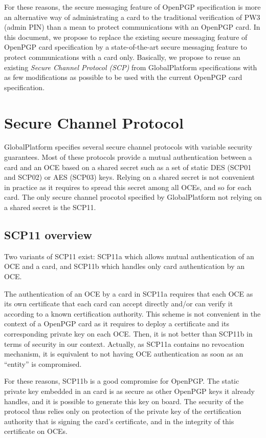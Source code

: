\documentclass[dvipdfmx,11pt,a4paper,english,final]{article}
\newcommand{\gp}[0]{Glo\-bal\-Plat\-form\xspace}
\begin{document}
For these reasons, the secure messaging feature of OpenPGP
specification is more an alternative way of administrating a card to
the traditional verification of PW3 (admin PIN) than a mean to protect
communications with an OpenPGP card. In this document, we propose to
replace the existing secure messaging feature of OpenPGP card
specification by a state-of-the-art secure messaging feature to
protect communications with a card only. Basically, we propose to
reuse an existing \emph{Secure Channel Protocol (SCP)} from \gp
specifications with as few modifications as possible to be used with
the current OpenPGP card specification.


\section{Secure Channel Protocol}
\label{sec:scp}

\gp specifies several secure channel protocols with variable security
guarantees. Most of these protocols provide a mutual authentication
between a card and an OCE based on a shared secret such as a set of
static DES (SCP01 and SCP02) or AES (SCP03) keys. Relying on a shared
secret is not convenient in practice as it requires to spread this
secret among all OCEs, and so for each card. The only secure channel
procotol specified by \gp not relying on a shared secret is the SCP11.

\subsection{SCP11 overview}

Two variants of SCP11 exist: SCP11a which allows mutual authentication
of an OCE and a card, and SCP11b which handles only card
authentication by an OCE.

The authentication of an OCE by a card in SCP11a requires that each
OCE as its own certificate that each card can accept directly and/or
can verify it according to a known certification authority. This
scheme is not convenient in the context of a OpenPGP card as it
requires to deploy a certificate and its corresponding private key on
each OCE. Then, it is not better than SCP11b in terms of security in
our context. Actually, as SCP11a contains no revocation mechanism, it
is equivalent to not having OCE authentication as soon as an
``entity'' is compromised.

For these reasons, SCP11b is a good compromise for OpenPGP. The static
private key embedded in an card is as secure as other OpenPGP keys it
already handles, and it is possible to generate this key on board. The
security of the protocol thus relies only on protection of the private
key of the certification authority that is signing the card’s
certificate, and in the integrity of this certificate on OCEs.
\end{document}
